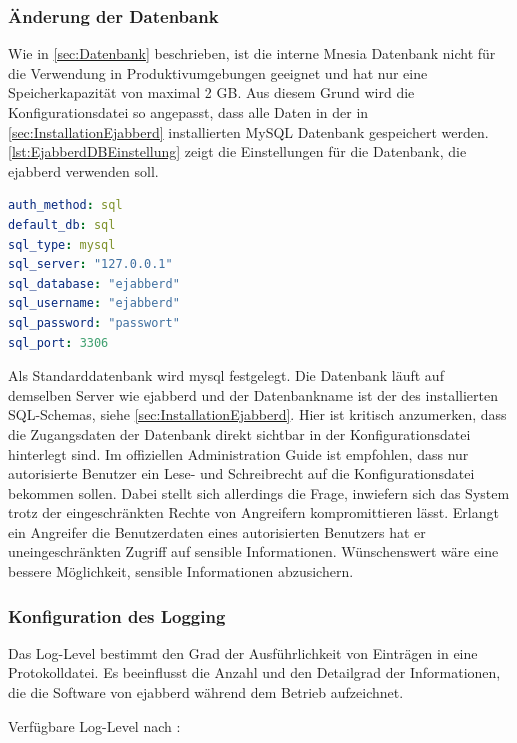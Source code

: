 \documentclass[a4paper,titlepage,halfparskip,12pt]{scrreprt}
\begin{document}
\begin{onehalfspacing}
\subsubsection*{Änderung der Datenbank}

Wie in \autoref{sec:Datenbank} beschrieben, ist die interne Mnesia Datenbank nicht für die Verwendung in Produktivumgebungen geeignet und hat nur eine Speicherkapazität von maximal 2 GB. Aus diesem Grund wird die Konfigurationsdatei so angepasst, dass alle Daten in der in \autoref{sec:InstallationEjabberd} installierten MySQL Datenbank gespeichert werden. \autoref{lst:EjabberdDBEinstellung} zeigt die Einstellungen für die Datenbank, die ejabberd verwenden soll.

\begin{lstlisting}[language=yaml, caption={Anpassung der Einstellungen für die Datenbank},label={lst:EjabberdDBEinstellung}]
auth_method: sql
default_db: sql
sql_type: mysql
sql_server: "127.0.0.1"
sql_database: "ejabberd"
sql_username: "ejabberd"
sql_password: "passwort"
sql_port: 3306
\end{lstlisting}

Als Standarddatenbank wird mysql festgelegt. Die Datenbank läuft auf demselben Server wie ejabberd und der Datenbankname ist der des installierten SQL-Schemas, siehe \autoref{sec:InstallationEjabberd}. Hier ist kritisch anzumerken, dass die Zugangsdaten der Datenbank direkt sichtbar in der Konfigurationsdatei hinterlegt sind. Im offiziellen Administration Guide \cite{plainTextConfigSecurity} ist empfohlen, dass nur autorisierte Benutzer ein Lese- und Schreibrecht auf die Konfigurationsdatei bekommen sollen. Dabei stellt sich allerdings die Frage, inwiefern sich das System trotz der eingeschränkten Rechte von Angreifern kompromittieren lässt. Erlangt ein Angreifer die Benutzerdaten eines autorisierten Benutzers hat er uneingeschränkten Zugriff auf sensible Informationen. Wünschenswert wäre eine bessere Möglichkeit, sensible Informationen abzusichern.

\subsubsection*{Konfiguration des Logging}

Das Log-Level bestimmt den Grad der Ausführlichkeit von Einträgen in eine Protokolldatei. Es beeinflusst die Anzahl und den Detailgrad der Informationen, die die Software von ejabberd während dem Betrieb aufzeichnet.\cite{ejabberdDoc}

Verfügbare Log-Level nach \cite{ejabberdDoc}:


\end{onehalfspacing}
\end{document}
